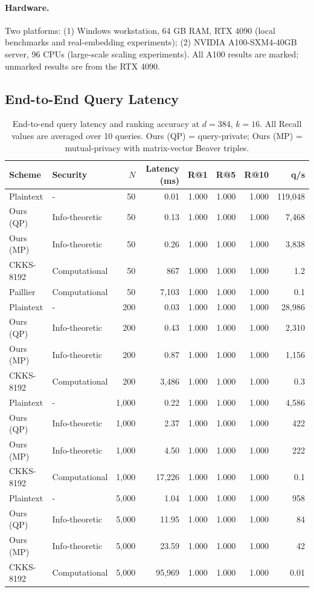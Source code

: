 \documentclass[11pt]{article}
\begin{document}
\paragraph{Hardware.} Two platforms: (1) Windows workstation, 64 GB RAM, RTX 4090 (local benchmarks and real-embedding experiments); (2) NVIDIA A100-SXM4-40GB server, 96 CPUs (large-scale scaling experiments). All A100 results are marked; unmarked results are from the RTX 4090.

\subsection{End-to-End Query Latency}

\begin{table}[t]
\centering
\caption{End-to-end query latency and ranking accuracy at $d = 384$, $k = 16$. All Recall values are averaged over 10 queries. Ours (QP) = query-private; Ours (MP) = mutual-privacy with matrix-vector Beaver triples.}
\label{tab:e2e}
\begin{tabular}{llrrrrrr}
\toprule
Scheme & Security & $N$ & Latency (ms) & R@1 & R@5 & R@10 & q/s \\
\midrule
Plaintext & {-} & 50 & 0.01 & 1.000 & 1.000 & 1.000 & 119{,}048 \\
Ours (QP) & Info-theoretic & 50 & 0.13 & 1.000 & 1.000 & 1.000 & 7{,}468 \\
Ours (MP) & Info-theoretic & 50 & 0.26 & 1.000 & 1.000 & 1.000 & 3{,}838 \\
CKKS-8192 & Computational & 50 & 867 & 1.000 & 1.000 & 1.000 & 1.2 \\
Paillier & Computational & 50 & 7{,}103 & 1.000 & 1.000 & 1.000 & 0.1 \\
\midrule
Plaintext & {-} & 200 & 0.03 & 1.000 & 1.000 & 1.000 & 28{,}986 \\
Ours (QP) & Info-theoretic & 200 & 0.43 & 1.000 & 1.000 & 1.000 & 2{,}310 \\
Ours (MP) & Info-theoretic & 200 & 0.87 & 1.000 & 1.000 & 1.000 & 1{,}156 \\
CKKS-8192 & Computational & 200 & 3{,}486 & 1.000 & 1.000 & 1.000 & 0.3 \\
\midrule
Plaintext & {-} & 1{,}000 & 0.22 & 1.000 & 1.000 & 1.000 & 4{,}586 \\
Ours (QP) & Info-theoretic & 1{,}000 & 2.37 & 1.000 & 1.000 & 1.000 & 422 \\
Ours (MP) & Info-theoretic & 1{,}000 & 4.50 & 1.000 & 1.000 & 1.000 & 222 \\
CKKS-8192 & Computational & 1{,}000 & 17{,}226 & 1.000 & 1.000 & 1.000 & 0.1 \\
\midrule
Plaintext & {-} & 5{,}000 & 1.04 & 1.000 & 1.000 & 1.000 & 958 \\
Ours (QP) & Info-theoretic & 5{,}000 & 11.95 & 1.000 & 1.000 & 1.000 & 84 \\
Ours (MP) & Info-theoretic & 5{,}000 & 23.59 & 1.000 & 1.000 & 1.000 & 42 \\
CKKS-8192 & Computational & 5{,}000 & 95{,}969 & 1.000 & 1.000 & 1.000 & 0.01 \\
\bottomrule
\end{tabular}
\end{table}
\end{document}

